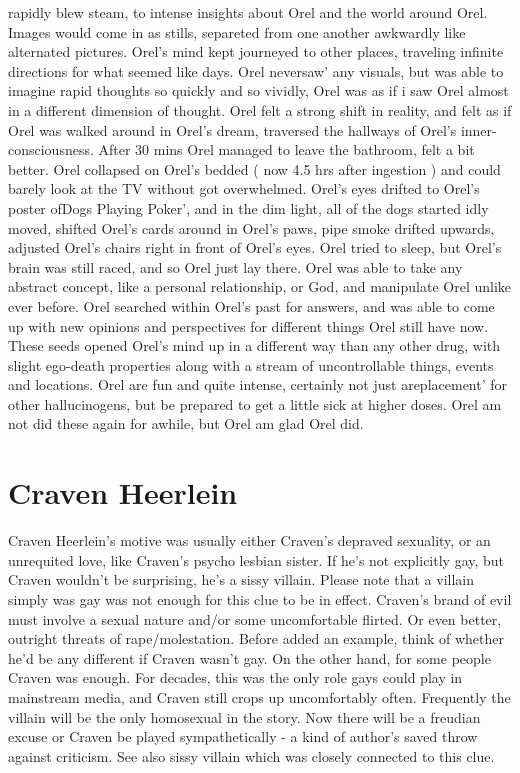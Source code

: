 \documentclass[12pt]{book}
\begin{document}
rapidly blew steam, to intense insights about Orel and the world around Orel. Images would come in as stills, separeted from one another awkwardly like alternated pictures. Orel's mind kept journeyed to other places, traveling infinite directions for what seemed like days. Orel neversaw' any visuals, but was able to imagine rapid thoughts so quickly and so vividly, Orel was as if i saw Orel almost in a different dimension of thought. Orel felt a strong shift in reality, and felt as if Orel was walked around in Orel's dream, traversed the hallways of Orel's inner-consciousness. After 30 mins Orel managed to leave the bathroom, felt a bit better. Orel collapsed on Orel's bedded ( now 4.5 hrs after ingestion ) and could barely look at the TV without got overwhelmed. Orel's eyes drifted to Orel's poster ofDogs Playing Poker', and in the dim light, all of the dogs started idly moved, shifted Orel's cards around in Orel's paws, pipe smoke drifted upwards, adjusted Orel's chairs right in front of Orel's eyes. Orel tried to sleep, but Orel's brain was still raced, and so Orel just lay there. Orel was able to take any abstract concept, like a personal relationship, or God, and manipulate Orel unlike ever before. Orel searched within Orel's past for answers, and was able to come up with new opinions and perspectives for different things Orel still have now. These seeds opened Orel's mind up in a different way than any other drug, with slight ego-death properties along with a stream of uncontrollable things, events and locations. Orel are fun and quite intense, certainly not just areplacement' for other hallucinogens, but be prepared to get a little sick at higher doses. Orel am not did these again for awhile, but Orel am glad Orel did.



\chapter{Craven Heerlein}

Craven Heerlein's motive was usually either Craven's depraved sexuality, or an unrequited love, like Craven's psycho lesbian sister. If he's not explicitly gay, but Craven wouldn't be surprising, he's a sissy villain. Please note that a villain simply was gay was not enough for this clue to be in effect. Craven's brand of evil must involve a sexual nature and/or some uncomfortable flirted. Or even better, outright threats of rape/molestation. Before added an example, think of whether he'd be any different if Craven wasn't gay. On the other hand, for some people Craven was enough. For decades, this was the only role gays could play in mainstream media, and Craven still crops up uncomfortably often. Frequently the villain will be the only homosexual in the story. Now there will be a freudian excuse or Craven be played sympathetically - a kind of author's saved throw against criticism. See also sissy villain which was closely connected to this clue.
\end{document}
